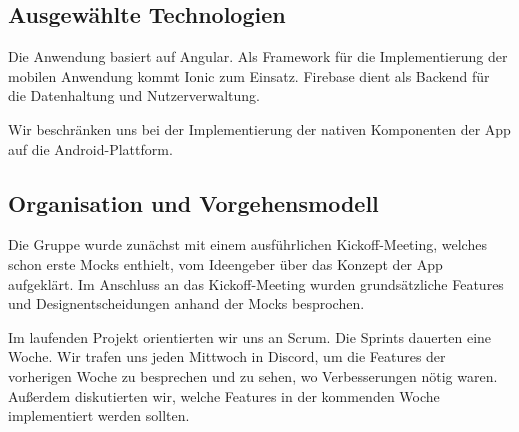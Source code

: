\subsection{Ausgewählte Technologien}

Die Anwendung basiert auf Angular.
Als Framework für die Implementierung der mobilen Anwendung kommt Ionic zum Einsatz.
Firebase dient als Backend für die Datenhaltung und Nutzerverwaltung.

Wir beschränken uns bei der Implementierung der nativen Komponenten der App auf die Android-Plattform.

\pagebreak

\subsection{Organisation und Vorgehensmodell}

Die Gruppe wurde zunächst mit einem ausführlichen Kickoff-Meeting, welches schon erste Mocks enthielt, vom Ideengeber über das Konzept der App aufgeklärt.
Im Anschluss an das Kickoff-Meeting wurden grundsätzliche Features und Designentscheidungen anhand der Mocks besprochen.

Im laufenden Projekt orientierten wir uns an Scrum.
Die Sprints dauerten eine Woche.
Wir trafen uns jeden Mittwoch in Discord, um die Features der vorherigen Woche zu besprechen und zu sehen, wo Verbesserungen nötig waren.
Außerdem diskutierten wir, welche Features in der kommenden Woche implementiert werden sollten.